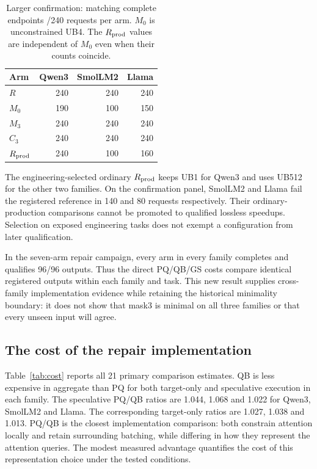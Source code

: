 \begin{table}[t]\centering\small
\caption{Larger confirmation: matching complete endpoints /240 requests per arm. $M_0$ is unconstrained UB4. The $R_{\rm prod}$ values are independent of $M_0$ even when their counts coincide.}
\label{tab:qual}
\begin{tabular}{@{}lrrr@{}}\toprule
Arm & Qwen3 & SmolLM2 & Llama\\\midrule
$R$ &240&240&240\\
$M_0$ &190&100&150\\
$M_3$ &240&240&240\\
$C_3$ &240&240&240\\
$R_{\rm prod}$ &240&100&160\\\bottomrule
\end{tabular}
\end{table}

The engineering-selected ordinary $R_{\rm prod}$ keeps UB1 for Qwen3 and uses UB512 for the other two families. On the confirmation panel, SmolLM2 and Llama fail the registered reference in 140 and 80 requests respectively. Their ordinary-production comparisons cannot be promoted to qualified lossless speedups. Selection on exposed engineering tasks does not exempt a configuration from later qualification.

In the seven-arm repair campaign, every arm in every family completes and qualifies 96/96 outputs. Thus the direct PQ/QB/GS costs compare identical registered outputs within each family and task. This new result supplies cross-family implementation evidence while retaining the historical minimality boundary: it does not show that mask3 is minimal on all three families or that every unseen input will agree.

\subsection{The cost of the repair implementation}
Table~\ref{tab:cost} reports all 21 primary comparison estimates. QB is less expensive in aggregate than PQ for both target-only and speculative execution in each family. The speculative PQ/QB ratios are 1.044, 1.068 and 1.022 for Qwen3, SmolLM2 and Llama. The corresponding target-only ratios are 1.027, 1.038 and 1.013. PQ/QB is the closest implementation comparison: both constrain attention locally and retain surrounding batching, while differing in how they represent the attention queries. The modest measured advantage quantifies the cost of this representation choice under the tested conditions.

